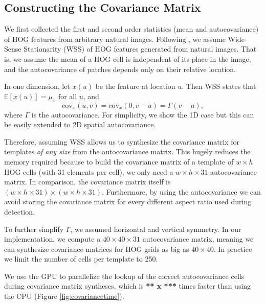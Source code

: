 \documentclass[10pt,twocolumn,letterpaper]{article}
\newcommand{\scream}[1]{{\color{red} \bf *** #1 ***}}
\begin{document}
\subsection{Constructing the Covariance Matrix}
\label{sec:feature_statistics}
We first collected the first and second order statistics (mean and autocovariance) of HOG features from arbitrary natural images. Following \cite{Hariharan12}, we assume Wide-Sense Stationarity (WSS) of HOG features generated from natural images. That is, we assume the mean of a HOG cell is independent of its place in the image, and the autocovariance of patches depends only on their relative location.

In one dimension, let $x(u)$ be the feature at location $u$. Then WSS states that $\mathbb{E}\left[x(u)\right] = \mu_x$ for all $u$, and
\begin{equation}
\textrm{cov}_x(u,v) = \textrm{cov}_x(0, v-u) = \Gamma(v-u),
\end{equation} where $\Gamma$ is the autocovariance. For simplicity, we show the 1D case but this can be easily extended to 2D spatial autocovariance.

Therefore, assuming WSS allows us to synthesize the covariance matrix for templates \emph{of any size} from the autocovariance matrix. This hugely reduces the memory required because to build the covariance matrix of a template of $w \times h$ HOG cells (with 31 elements per cell), we only need a $w \times h \times 31$ autocovariance matrix. In comparison, the covariance matrix itself is $(w \times h \times 31) \times (w \times h \times 31)$. Furthermore, by using the autocovariance we can avoid storing the covariance matrix for every different aspect ratio used during detection.

To further simplify $\Gamma$, we assumed horizontal and vertical symmetry. In our implementation, we compute a $40 \times 40 \times 31$ autocovariance matrix, meaning we can synthesize covariance matrices for HOG grids as big as $40 \times 40$. In practice we limit the number of cells per template to 250.

We use the GPU to parallelize the lookup of the correct autocovariance cells during covariance matrix syntheses, which is \scream{x} times faster than using the CPU (Figure \ref{fig:covariancetime}).



\end{document}
